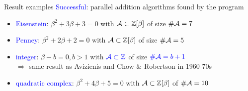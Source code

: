 \documentclass[11pt]{beamer}
\begin{document}
\begin{frame}{Result examples}
\fontsize{10pt}{10}\selectfont
    \textcolor{blue}{{Successful}}: parallel addition {algorithms found by the program}
        \begin{itemize}
            \item \textcolor{blue}{Eisenstein}: $ \beta^2 + 3\beta + 3 = 0 $ with \textcolor{blue}{$ \mathcal{A} \subset \mathbb{Z}[\beta]$} of size \textcolor{blue}{$\# \mathcal{A} = 7 $}
            \item \textcolor{blue}{Penney}:  $ \beta^2 + 2\beta + 2 = 0 $
                     with \textcolor{blue}{$ \mathcal{A} \subset \mathbb{Z}[\beta]$} of size \textcolor{blue}{$\# \mathcal{A} = 5 $}
            \item \textcolor{blue}{integer}: $ \beta - b = 0, b >1 $ with $ \textcolor{blue}{ \mathcal{A} \subset \mathbb{Z}} $ of size $\textcolor{blue}{\# \mathcal{A} = b+1}$\\
                    $\Rightarrow $ same result as Avizienis and Chow \& Robertson in 1960-70s
            \item \textcolor{blue}{quadratic complex}: $\beta^2 + 4\beta + 5 = 0$ with \textcolor{blue}{$\mathcal{A} \subset \mathbb{Z}[\beta]$} of \textcolor{blue}{$\# \mathcal{A} = 10$}
        \end{itemize}


\end{frame}
\end{document}
